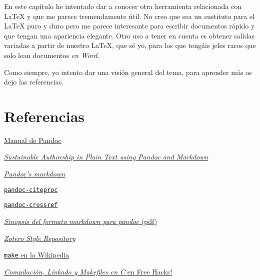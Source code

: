 En este capítulo he intentado dar a conocer otra herramienta relacionada
con LaTeX y que me parece tremendamente útil. No creo que sea un
sustituto para el LaTeX puro y duro pero me parece interesante para
escribir documentos rápido y que tengan una apariencia elegante. Otro
uso a tener en cuenta es obtener salidas variadas a partir de nuestro
LaTeX, que sé yo, para los que tengáis jefes raros que solo lean
documentos \emph{en Word}.

Como siempre, yo intento dar una visión general del tema, para aprender
más os dejo las referencias.

\section{Referencias}

\href{http://pandoc.org/MANUAL.html}{Manual de Pandoc}

\href{http://programminghistorian.org/lessons/sustainable-authorship-in-plain-text-using-pandoc-and-markdown}{\emph{Sustainable
Authorship in Plain Text using Pandoc and Markdown}}

\href{http://pandoc.org/MANUAL.html\#pandocs-markdown}{\emph{Pandoc's
markdown}}

\href{https://github.com/jgm/pandoc-citeproc/blob/master/man/pandoc-citeproc.1.md}{\lstinline!pandoc-citeproc!}

\href{https://github.com/lierdakil/pandoc-crossref}{\lstinline!pandoc-crossref!}

\href{http://servbiob.inf.um.es/proyectos/public/attachments/download/8/texput.pdf}{\emph{Sinopsis
del formato markdown para pandoc} (pdf)}

\href{https://www.zotero.org/styles}{\emph{Zotero Style Repository}}

\href{https://es.wikipedia.org/wiki/Make}{\lstinline!make! en la
Wikipedia}

\href{https://pfctelepathy.wordpress.com/2015/05/11/intro-compilacion-linkado-y-makefiles-en-c/}{\emph{Compilación,
Linkado y Makefiles en C} en Free Hacks!}
